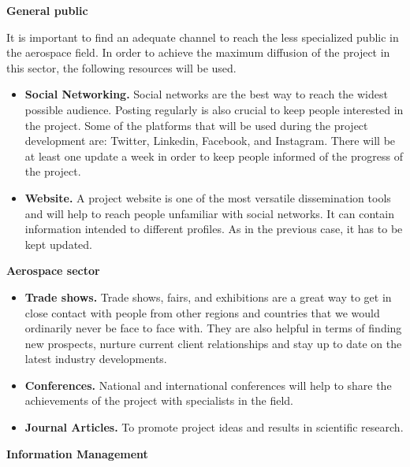 \textbf{General public}

It is important to find an adequate channel to reach the less specialized public in the aerospace field. In order to achieve the maximum diffusion of the project in this sector,  the following resources will be used.

\begin{itemize}
	\item{ 
		\textbf{Social Networking.} Social networks are the best way to reach the widest possible audience. Posting regularly is also crucial to keep people interested in the project. Some of the platforms that will be used during the project development are: Twitter, Linkedin, Facebook, and Instagram. There will be at least one update a week in order to keep people informed of the progress of the project.
	}
	\item {
		\textbf{Website.} A project website is one of the most versatile dissemination tools and will help to reach people unfamiliar with social networks. It can contain information intended to different profiles. As in the previous case, it has to be kept updated.
	}
\end{itemize}

\textbf{Aerospace sector}


\begin{itemize}
	
	\item{
		\textbf{Trade shows.} Trade shows, fairs, and exhibitions are a great way to get in close contact with people from other regions and countries that we would ordinarily never be face to face with. They are also helpful in terms of finding new prospects, nurture current client relationships and stay up to date on the latest industry developments. 
	}
	\item {
		\textbf{Conferences.} National and international conferences will help to share the achievements of the project with specialists in the field.
	}
	\item {
		\textbf{Journal Articles.} To promote project ideas and results in scientific research.
	}
\end{itemize}



\textbf{Information Management}


